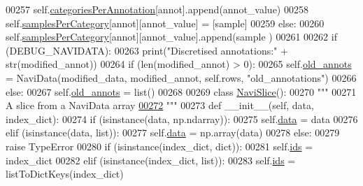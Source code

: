 \begin{DoxyCode}
00257                         self.\hyperlink{classnavicom_1_1navidata_1_1NaviAnnotations_a1c26e115cb2eabe4384cd2fa0c7f776f}{categoriesPerAnnotation}[annot].append(annot\_value)
00258                         self.\hyperlink{classnavicom_1_1navidata_1_1NaviAnnotations_a7cbb4ab623948f19e055f5b4b7c938a9}{samplesPerCategory}[annot][annot\_value] = [sample]
00259                     \textcolor{keywordflow}{else}:
00260                         self.\hyperlink{classnavicom_1_1navidata_1_1NaviAnnotations_a7cbb4ab623948f19e055f5b4b7c938a9}{samplesPerCategory}[annot][annot\_value].append(sample
      )
00261 
00262         \textcolor{keywordflow}{if} (DEBUG\_NAVIDATA):
00263             \textcolor{keywordflow}{print}(\textcolor{stringliteral}{"Discretised annotations:"} + str(modified\_annot))
00264         \textcolor{keywordflow}{if} (len(modified\_annot) > 0):
00265             self.\hyperlink{classnavicom_1_1navidata_1_1NaviAnnotations_ab053ca65505c1a9d72e2afb96ddcae9c}{old_annots} = NaviData(modified\_data, modified\_annot, self.rows, 
      \textcolor{stringliteral}{"old\_annotations"})
00266         \textcolor{keywordflow}{else}:
00267             self.\hyperlink{classnavicom_1_1navidata_1_1NaviAnnotations_ab053ca65505c1a9d72e2afb96ddcae9c}{old_annots} = list()
00268 
00269 \textcolor{keyword}{class }\hyperlink{classnavicom_1_1navidata_1_1NaviSlice}{NaviSlice}():
00270     \textcolor{stringliteral}{"""}
00271 \textcolor{stringliteral}{    A slice from a NaviData array}
\hypertarget{navidata_8py_source_l00272}{}\hyperlink{classnavicom_1_1navidata_1_1NaviSlice}{00272} \textcolor{stringliteral}{    """}
00273     \textcolor{keyword}{def }\_\_init\_\_(self, data, index\_dict):
00274         \textcolor{keywordflow}{if} (isinstance(data, np.ndarray)):
00275             self.\hyperlink{classnavicom_1_1navidata_1_1NaviSlice_a21ac86b9fbcb4ffc952782983690af5f}{data} = data
00276         \textcolor{keywordflow}{elif} (isinstance(data, list)):
00277             self.\hyperlink{classnavicom_1_1navidata_1_1NaviSlice_a21ac86b9fbcb4ffc952782983690af5f}{data} = np.array(data)
00278         \textcolor{keywordflow}{else}:
00279             \textcolor{keywordflow}{raise} TypeError
00280         \textcolor{keywordflow}{if} (isinstance(index\_dict, dict)):
00281             self.\hyperlink{classnavicom_1_1navidata_1_1NaviSlice_abc8769a0168ce54ee35624363deb0bcd}{ids} = index\_dict
00282         \textcolor{keywordflow}{elif} (isinstance(index\_dict, list)):
00283             self.\hyperlink{classnavicom_1_1navidata_1_1NaviSlice_abc8769a0168ce54ee35624363deb0bcd}{ids} = listToDictKeys(index\_dict)

\end{DoxyCode}
